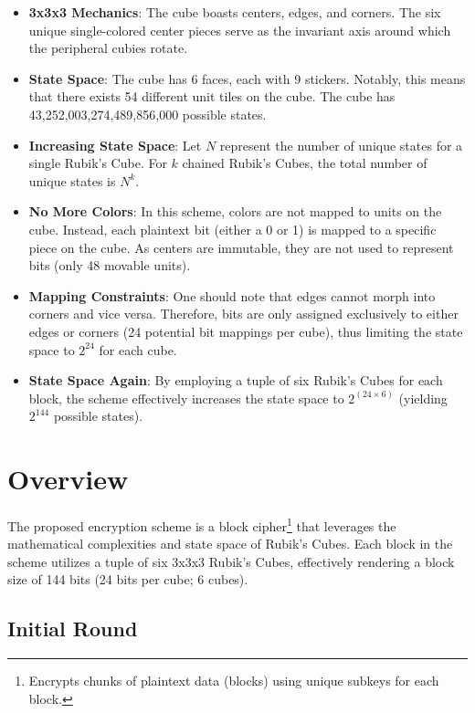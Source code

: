\documentclass[12pt]{article}
\begin{document}
\begin{itemize}
    \item \textbf{3x3x3 Mechanics}: The cube boasts centers, edges, and corners. The six unique single-colored center pieces serve as the invariant axis around which the peripheral cubies rotate.
    \item \textbf{State Space}: The cube has 6 faces, each with 9 stickers. Notably, this means that there exists 54 different unit tiles on the cube. The cube has 43,252,003,274,489,856,000 possible states.
    \item \textbf{Increasing State Space}: Let \( N \) represent the number of unique states for a single Rubik's Cube. For \( k \) chained Rubik's Cubes, the total number of unique states is \( N^k \). 
    \item \textbf{No More Colors}: In this scheme, colors are not mapped to units on the cube. Instead, each plaintext bit (either a 0 or 1) is mapped to a specific piece on the cube. As centers are immutable, they are not used to represent bits (only 48 movable units).
    \item \textbf{Mapping Constraints}: One should note that edges cannot morph into corners and vice versa. Therefore, bits are only assigned exclusively to either edges or corners (24 potential bit mappings per cube), thus limiting the state space to \(2^{24}\) for each cube.
    \item \textbf{State Space Again}: By employing a tuple of six Rubik's Cubes for each block, the scheme effectively increases the state space to \(2^{(24 \times 6)}\) (yielding \(2^{144}\) possible states).
\end{itemize}

\newpage

\section{Overview}

The proposed encryption scheme is a block cipher\footnote{Encrypts chunks of plaintext data (blocks) using unique subkeys for each block.} that leverages the mathematical complexities and state space of Rubik's Cubes. Each block in the scheme utilizes a tuple of six 3x3x3 Rubik's Cubes, effectively rendering a block size of 144 bits (24 bits per cube; 6 cubes).

\subsection{Initial Round}
\end{document}
